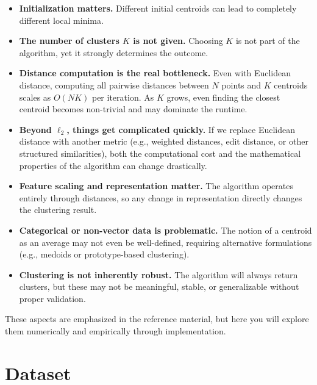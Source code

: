 \documentclass[11pt]{article}
\begin{document}
\begin{itemize}[itemsep=3pt]

    \item \textbf{Initialization matters.}  
    Different initial centroids can lead to completely different local minima.

    \item \textbf{The number of clusters \(K\) is not given.}  
    Choosing \(K\) is not part of the algorithm, yet it strongly determines the outcome.

    \item \textbf{Distance computation is the real bottleneck.}  
    Even with Euclidean distance, computing all pairwise distances between \(N\) points and \(K\) centroids scales as \(O(NK)\) per iteration.  
    As \(K\) grows, even finding the closest centroid becomes non-trivial and may dominate the runtime.

    \item \textbf{Beyond \(\ell_2\), things get complicated quickly.}  
    If we replace Euclidean distance with another metric (e.g., weighted distances, edit distance, or other structured similarities), both the computational cost and the mathematical properties of the algorithm can change drastically.

    \item \textbf{Feature scaling and representation matter.}  
    The algorithm operates entirely through distances, so any change in representation directly changes the clustering result.

    \item \textbf{Categorical or non-vector data is problematic.}  
    The notion of a centroid as an average may not even be well-defined, requiring alternative formulations (e.g., medoids or prototype-based clustering).

    \item \textbf{Clustering is not inherently robust.}  
    The algorithm will always return clusters, but these may not be meaningful, stable, or generalizable without proper validation.

\end{itemize}

These aspects are emphasized in the reference material, but here you will explore them numerically and empirically through implementation.
\section*{Dataset}
\end{document}
